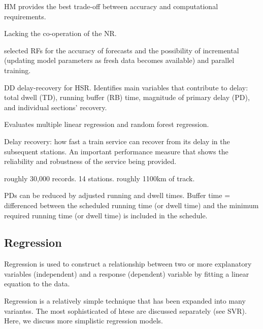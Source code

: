 \documentclass{article}
\begin{document}
HM provides the best trade-off between accuracy and computational requirements. 

Lacking the co-operation of the NR. 

\cite{nair_et_al_2019} selected RFs for the accuracy of forecasts and the possibility of incremental (updating model parameters as fresh data becomes available) and parallel training. 

\cite{wen_et_al_2017} DD delay-recovery for HSR. Identifies main variables that contribute to delay: total dwell (TD), running buffer (RB) time, magnitude of primary delay (PD), and individual sections' recovery.

Evaluates multiple linear regression and random forest regression. 

Delay recovery: how fast a train service can recover from its delay in the subsequent stations. An important performance measure that shows the reliability and robustness of the service being provided. 

roughly 30,000 records. 14 stations. roughly 1100km of track. 

PDs can be reduced by adjusted running and dwell times. Buffer time = differenced between the scheduled running time (or dwell time) and the minimum required running time (or dwell time) is included in the schedule.

\subsection{Regression}

Regression is used to construct a relationship between two or more explanatory variables (independent) and a response (dependent) variable by fitting a linear equation to the data. 

Regression is a relatively simple technique that has been expanded into many variantss. The most sophisticated of htese are discussed separately (see SVR). Here, we discuss more simplistic regression models. 

\cite{wang_et_al_2019} 
\end{document}
